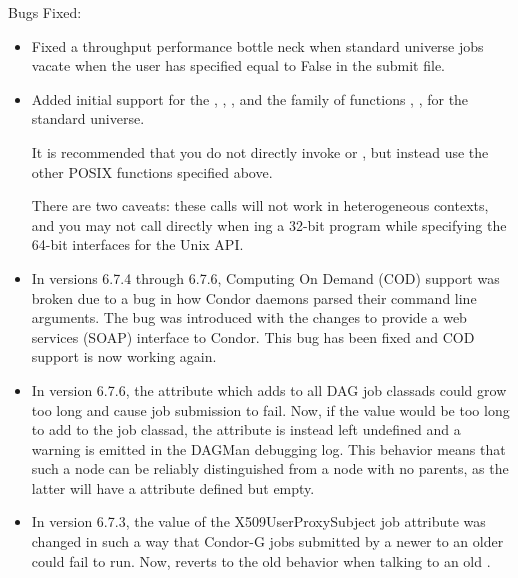 \noindent Bugs Fixed:

\begin{itemize}

\item Fixed a throughput performance bottle neck when standard universe
        jobs vacate when the user has specified  equal to
        False in the submit file.

\item Added initial support for the ,
        , , and the family of functions
        , ,  for the
        standard universe.  

        It is recommended that you do not directly invoke  
        or , but instead use the other POSIX functions
        specified above.

        There are two caveats: these calls will not work in heterogeneous
        contexts, and you may not call  directly when 
        ing a 32-bit program while specifying the 64-bit
        interfaces for the Unix API.

\item In versions 6.7.4 through 6.7.6, Computing On Demand (COD)
  support was broken due to a bug in how Condor daemons parsed their
  command line arguments.
  The bug was introduced with the changes to provide a web services
  (SOAP) interface to Condor.
  This bug has been fixed and COD support is now working again.

\item In version 6.7.6, the  attribute
which  adds to all DAG job classads could grow too long
and cause job submission to fail.  Now, if the
 value would be too long to add to the job
classad, the attribute is instead left undefined and a warning is
emitted in the DAGMan debugging log.  This behavior means that such a
node can be reliably distinguished from a node with no parents, as the
latter will have a  attribute defined but
empty.

\item In version 6.7.3, the value of the X509UserProxySubject job attribute
was changed in such a way that Condor-G jobs submitted by a newer
 to an older  could fail to run. Now,
 reverts to the old behavior when talking to an old
.


\end{itemize}
